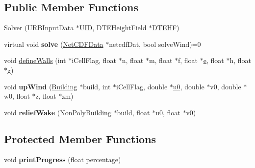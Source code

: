 \subsection*{Public Member Functions}
\begin{DoxyCompactItemize}
\item 
\hyperlink{classSolver_a0df0752d39f016c7dc636d8c46274218}{Solver} (\hyperlink{classURBInputData}{U\+R\+B\+Input\+Data} $\ast$U\+ID, \hyperlink{classDTEHeightField}{D\+T\+E\+Height\+Field} $\ast$D\+T\+E\+HF)
\item 
\mbox{\label{classSolver_ad004f38b8aff33fa13a8971f87f7816e}} 
virtual void {\bfseries solve} (\hyperlink{classNetCDFData}{Net\+C\+D\+F\+Data} $\ast$netcdf\+Dat, bool solve\+Wind)=0
\item 
void \hyperlink{classSolver_a66fa054cbf52fd6c184386fe11f9cadf}{define\+Walls} (int $\ast$i\+Cell\+Flag, float $\ast$n, float $\ast$m, float $\ast$f, float $\ast$\hyperlink{classSolver_ab65a76ec3befd44f11e817fdef8f47a6}{e}, float $\ast$h, float $\ast$g)
\item 
\mbox{\label{classSolver_af815849a5dda94feb2a5a0e5afa3e5a2}} 
void {\bfseries up\+Wind} (\hyperlink{classBuilding}{Building} $\ast$build, int $\ast$i\+Cell\+Flag, double $\ast$\hyperlink{classSolver_aaf60f18219d1d08959b9a6fa209d5e17}{u0}, double $\ast$v0, double $\ast$w0, float $\ast$z, float $\ast$zm)
\item 
\mbox{\label{classSolver_aa74c027e6f75376d459cecbfd71dbc2f}} 
void {\bfseries relief\+Wake} (\hyperlink{classNonPolyBuilding}{Non\+Poly\+Building} $\ast$build, float $\ast$\hyperlink{classSolver_aaf60f18219d1d08959b9a6fa209d5e17}{u0}, float $\ast$v0)
\end{DoxyCompactItemize}
\subsection*{Protected Member Functions}
\begin{DoxyCompactItemize}
\item 
\mbox{\label{classSolver_a4380db2e63e45a27b1cae8d9558f004d}} 
void {\bfseries print\+Progress} (float percentage)
\end{DoxyCompactItemize}
